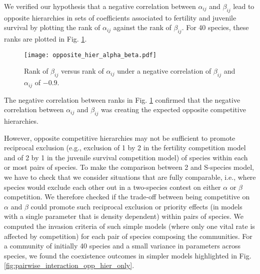 \documentclass{article}
\begin{document}
We verified our hypothesis that a negative correlation between $\alpha_{ij}$ and $\beta_{ij}$ lead to opposite hierarchies in sets of coefficients associated to fertility and juvenile survival by plotting the rank of $\alpha_{ij}$ against the rank of $\beta_{ij}$.
For 40 species, these ranks are plotted in Fig. \ref{fig:opposite_hier_alpha_beta}.
\begin{figure}[H]
    \centering
    \texttt{[image: opposite\_hier\_alpha\_beta.pdf]}
    \caption{Rank of $\beta_{ij}$ versus rank of $\alpha_{ij}$ under a negative correlation of $\beta_{ij}$ and $\alpha_{ij}$ of  $-0.9$.}
    \label{fig:opposite_hier_alpha_beta}
\end{figure}
The negative correlation between ranks in Fig. \ref{fig:opposite_hier_alpha_beta} confirmed that the negative correlation between $\alpha_{ij}$ and $\beta_{ij}$ was creating the expected opposite competitive hierarchies. 

However, opposite competitive hierarchies may not be sufficient to promote reciprocal exclusion (e.g., exclusion of 1 by 2 in the fertility competition model and of 2 by 1 in the juvenile survival competition model) of species within each or most pairs of species. To make the comparison between 2 and S-species model, we have to check that we consider situations that are fully comparable, i.e., where species would exclude each other out in a two-species contest on either $\alpha$ or $\beta$ competition. We therefore checked if the trade-off between being competitive on $\alpha$ and $\beta$ could promote such reciprocal exclusion or priority effects (in models with a single parameter that is density dependent) within pairs of species. We computed the invasion criteria of such simple models (where only one vital rate is affected by competition) for each pair of species composing the communities. For a community of initially 40 species and a small variance in parameters across species, we found the coexistence outcomes in simpler models highlighted in Fig. \ref{fig:pairwise_interaction_opp_hier_only}. 
\end{document}
